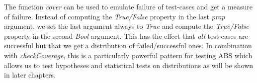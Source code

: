 The function \textit{cover} can be used to emulate failure of test-cases and get a measure of failure. Instead of computing the \textit{True/False} property in the last \textit{prop} argument, we set the last argument always to \textit{True} and compute the \textit{True/False} property in the second \textit{Bool} argument. This has the effect that \textit{all} test-cases are successful but that we get a distribution of failed/successful ones. In combination with \textit{checkCoverage}, this is a particularly powerful pattern for testing ABS which allows us to test hypotheses and statistical tests on distributions as will be shown in later chapters.